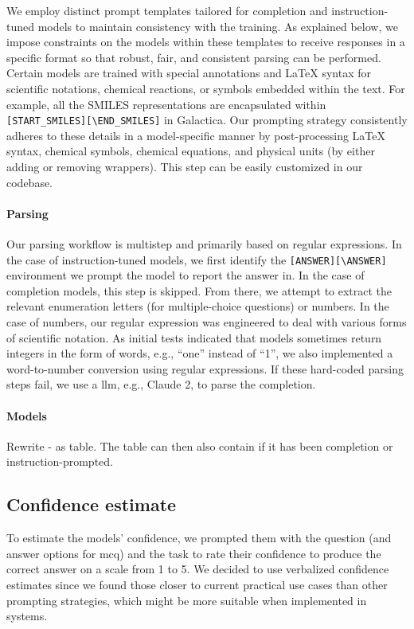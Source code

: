 \documentclass[11pt, oneside]{article}
\begin{document}
\begin{refsection}
We employ distinct prompt templates tailored for completion and instruction-tuned models to maintain consistency with the training. 
As explained below, we impose constraints on the models within these templates to receive responses in a specific format so that robust, fair, and consistent parsing can be performed.
Certain models are trained with special annotations and \LaTeX\xspace syntax for scientific notations, chemical reactions, or symbols embedded within the text. 
For example, all the SMILES representations are encapsulated within \texttt{[START\_SMILES][\textbackslash END\_SMILES]} in Galactica\autocite{taylor2022galactica}.
Our prompting strategy consistently adheres to these details in a model-specific manner by post-processing \LaTeX\xspace syntax, chemical symbols, chemical equations, and physical units (by either adding or removing wrappers).
This step can be easily customized in our codebase.



\paragraph{Parsing}
Our parsing workflow is multistep and primarily based on regular expressions.
In the case of instruction-tuned models, we first identify the \texttt{[ANSWER]}\texttt{[\textbackslash ANSWER]} environment we prompt the model to report the answer in.
In the case of completion models, this step is skipped. From there, we attempt to extract the relevant enumeration letters (for multiple-choice questions) or numbers.
In the case of numbers, our regular expression was engineered to deal with various forms of scientific notation.
As initial tests indicated that models sometimes return integers in the form of words, e.g., \enquote{one} instead of \enquote{1}, we also implemented a word-to-number conversion using regular expressions.
If these hard-coded parsing steps fail, we use a \gls{llm}, e.g., Claude 2, to parse the completion.


\paragraph{Models}
Rewrite - as table. The table can then also contain if it has been completion or instruction-prompted.

\subsection{Confidence estimate}
To estimate the models' confidence, we prompted them with the question (and answer options for \gls{mcq}) and the task to rate their confidence to produce the correct answer on a scale from 1 to 5. 
We decided to use verbalized confidence estimates\autocite{xiong2023llms} since we found those closer to current practical use cases than other prompting strategies, which might be more suitable when implemented in systems.


\end{refsection}
\end{document}
